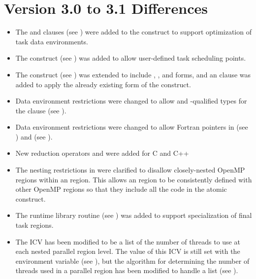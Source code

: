 \section{Version 3.0 to 3.1 Differences}
\label{sec:Version 3.0 to 3.1 Differences}
\begin{itemize}
\item The  and  clauses (see 
) were added to 
the  construct to support optimization of task data environments.

\item The  construct (see 
) was added to allow 
user-defined task scheduling points.

\item The  construct (see 
) was extended to include 
, , and  forms, and an  clause was added to apply 
the already existing form of the  construct.

\item Data environment restrictions were changed to allow  and 
-qualified types for the  clause (see 
).

\item Data environment restrictions were changed to allow Fortran pointers in 
 (see 
) 
and  (see 
).

\item New reduction operators  and  were added for C and C++ 

\item The nesting restrictions in 
 were clarified to disallow 
closely-nested OpenMP regions within an  region. This allows an  
region to be consistently defined with other OpenMP regions so that they include all 
the code in the atomic construct.

\item The  runtime library routine (see 
) was 
added to support specialization of final task regions.

\item The  ICV has been modified to be a list of the number of threads to use 
at each nested parallel region level. The value of this ICV is still set with the 
 environment variable (see 
), but the 
algorithm for determining the number of threads used in a parallel region has been 
modified to handle a list (see 
).


\end{itemize}
